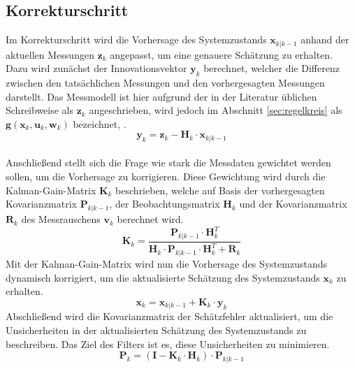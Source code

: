 \subsection{Korrekturschritt}
\label{subsec:korrekturschritt}
Im Korrekturschritt wird die Vorhersage des Systemzustands $\mathbf{x}_{k|k-1}$ anhand der aktuellen Messungen $\mathbf{z}_k$ angepasst, um eine genauere Schätzung zu erhalten. Dazu wird zunächst der Innovationsvektor $\mathbf{y}_k$ berechnet, welcher die Differenz zwischen den tatsächlichen Messungen und den vorhergesagten Messungen darstellt. Das Messmodell ist hier aufgrund der in der Literatur üblichen Schreibweise als $\mathbf{z}_k$ angeschrieben, wird jedoch im Abschnitt \ref{sec:regelkreis} als $\mathbf{g}(\mathbf{x}_k, \mathbf{u}_k, \mathbf{w}_k)$ bezeichnet, .
\begin{equation}
    \mathbf{y}_k = \mathbf{z}_k - \mathbf{H}_k \cdot \mathbf{x}_{k|k-1}
\end{equation}
\\
Anschließend stellt sich die Frage wie stark die Messdaten gewichtet werden sollen, um die Vorhersage zu korrigieren. Diese Gewichtung wird durch die Kalman-Gain-Matrix $\mathbf{K}_k$ beschrieben, welche auf Basis der vorhergesagten Kovarianzmatrix $\mathbf{P}_{k|k-1}$, der Beobachtungsmatrix $\mathbf{H}_k$ und der Kovarianzmatrix $\mathbf{R}_k$ des Messrauschens $\mathbf{v}_k$ berechnet wird.
\begin{equation}
    \mathbf{K}_k = \frac{\mathbf{P}_{k|k-1} \cdot \mathbf{H}_k^T }{\mathbf{H}_k \cdot \mathbf{P}_{k|k-1} \cdot \mathbf{H}_k^T + \mathbf{R}_k} 
\end{equation}
Mit der Kalman-Gain-Matrix wird nun die Vorhersage des Systemzustands dynamisch korrigiert, um die aktualisierte Schätzung des Systemzustands $\mathbf{x}_k$ zu erhalten.
\begin{equation}
    \mathbf{x}_k = \mathbf{x}_{k|k-1} + \mathbf{K}_k \cdot \mathbf{y}_k
\end{equation}
Abschließend wird die Kovarianzmatrix der Schätzfehler aktualisiert, um die Unsicherheiten in der aktualisierten Schätzung des Systemzustands zu beschreiben. Das Ziel des Filters ist es, diese Unsicherheiten zu minimieren.
\begin{equation}
    \mathbf{P}_k = (\mathbf{I} - \mathbf{K}_k \cdot \mathbf{H}_k) \cdot \mathbf{P}_{k|k-1}
\end{equation}
